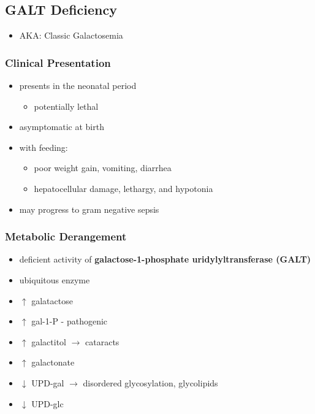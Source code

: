 \documentclass[12pt]{scrartcl}
\begin{document}
\subsection{GALT Deficiency}
\label{sec:org374e368}
\begin{itemize}
\item AKA: Classic Galactosemia
\end{itemize}
\subsubsection{Clinical Presentation}
\label{sec:orgfc2c044}
\begin{itemize}
\item presents in the neonatal period
\begin{itemize}
\item potentially lethal
\end{itemize}
\item asymptomatic at birth
\item with feeding:
\begin{itemize}
\item poor weight gain, vomiting, diarrhea
\item hepatocellular damage, lethargy, and hypotonia
\end{itemize}
\item may progress to gram negative sepsis
\end{itemize}

\subsubsection{Metabolic Derangement}
\label{sec:org57c3244}
\begin{itemize}
\item deficient activity of \textbf{galactose-1-phosphate uridylyltransferase (GALT)}
\end{itemize}


\begin{itemize}
\item ubiquitous enzyme
\item \(\uparrow\)  galatactose
\item \(\uparrow\) gal-1-P - pathogenic
\item \(\uparrow\) galactitol \(\to\) cataracts
\item \(\uparrow\) galactonate
\item \(\downarrow\) UPD-gal \(\to\) disordered glycosylation, glycolipids
\item \(\downarrow\) UPD-glc
\end{itemize}
\end{document}
